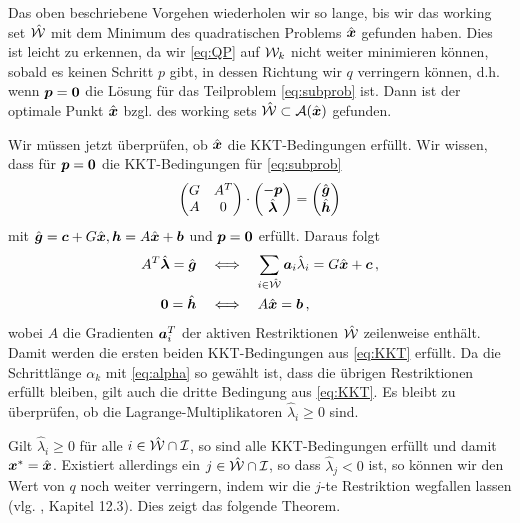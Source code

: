 Das oben beschriebene Vorgehen wiederholen wir so lange, bis wir das {working set} $\hat {\mathcal W}$ mit dem Minimum des quadratischen Problems $\hat{\boldsymbol x}$ gefunden haben. Dies ist leicht zu erkennen, da wir \eqref{eq:QP} auf $\mathcal W_k$ nicht weiter minimieren können, sobald es keinen Schritt $p$ gibt, in dessen Richtung wir $q$ verringern können, d.h. wenn $\boldsymbol p = \boldsymbol 0$ die Lösung für das Teilproblem \eqref{eq:subprob} ist.  Dann ist der optimale Punkt $\hat{\boldsymbol x}$ bzgl. des {working sets} $\hat{\mathcal W}\subset \mathcal A(\hat{\boldsymbol x})$ gefunden.

Wir müssen jetzt überprüfen, ob $\hat{\boldsymbol x}$ die KKT-Bedingungen erfüllt. Wir wissen, dass für $\boldsymbol p= \boldsymbol 0$ die KKT-Bedingungen für \eqref{eq:subprob}
\begin{align*}
\begin{pmatrix}
	G & A^T \\
	A & 0
\end{pmatrix} \cdot
\begin{pmatrix} 
-\boldsymbol p \\
\hat{\boldsymbol\lambda}
 \end{pmatrix} =
 \begin{pmatrix}
 	\hat{\boldsymbol g} \\
	\hat{\boldsymbol h}
 \end{pmatrix}
\end{align*}
mit $\hat{\boldsymbol g} = \boldsymbol c + G\hat{\boldsymbol x}, \boldsymbol h = A\hat{\boldsymbol x}+\boldsymbol b$ und $\boldsymbol p=\boldsymbol 0$ erfüllt. Daraus folgt
\begin{align*}
	A^T \hat{\boldsymbol \lambda} = \hat{\boldsymbol g}  \quad &\Longleftrightarrow \quad \sum_{i \in \hat{\mathcal W}}\boldsymbol a_i \hat\lambda_i = G\hat{\boldsymbol x} +\boldsymbol c \, , \\
	\boldsymbol 0 = \hat{\boldsymbol h} \quad  & \Longleftrightarrow \quad A\hat{\boldsymbol x} =\boldsymbol b\, , 
\end{align*}
wobei $A$ die Gradienten $\boldsymbol a_i^T$ der aktiven Restriktionen $\hat{\mathcal W}$ zeilenweise  enthält. Damit werden die ersten beiden KKT-Bedingungen aus \eqref{eq:KKT} erfüllt. Da die Schrittlänge $\alpha_k$ mit \eqref{eq:alpha} so gewählt ist, dass die übrigen Restriktionen erfüllt bleiben, gilt auch die dritte Bedingung aus \eqref{eq:KKT}. Es bleibt zu überprüfen, ob die Lagrange-Multiplikatoren $\hat\lambda_i \ge 0$ sind.

Gilt $\hat\lambda_i \ge 0$ für alle $i \in \hat{\mathcal W} \cap \mathcal I$, so sind alle KKT-Bedingungen erfüllt und damit $\boldsymbol x^* = \hat{\boldsymbol x}$. Existiert allerdings ein $j \in \hat{\mathcal W} \cap \mathcal I$, so dass $\hat \lambda_j < 0$ ist, so können wir den Wert von $q$ noch weiter verringern, indem wir die $j$-te Restriktion wegfallen lassen (vlg. \cite{NocWri}, Kapitel 12.3). Dies zeigt das folgende Theorem.

